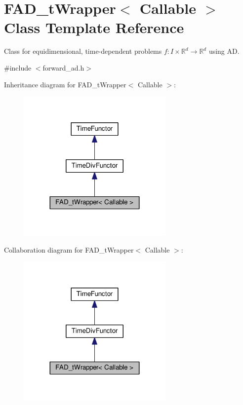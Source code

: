 \hypertarget{classFAD__tWrapper}{}\section{F\+A\+D\+\_\+t\+Wrapper$<$ Callable $>$ Class Template Reference}
\label{classFAD__tWrapper}


Class for equidimensional, time-\/dependent problems $f:I\times\mathbb{R}^d \rightarrow \mathbb{R}^d$ using AD.  




{\ttfamily \#include $<$forward\+\_\+ad.\+h$>$}



Inheritance diagram for F\+A\+D\+\_\+t\+Wrapper$<$ Callable $>$\+:\nopagebreak
\begin{figure}[H]
\begin{center}
\leavevmode
\includegraphics[width=215pt]{classFAD__tWrapper__inherit__graph}
\end{center}
\end{figure}


Collaboration diagram for F\+A\+D\+\_\+t\+Wrapper$<$ Callable $>$\+:\nopagebreak
\begin{figure}[H]
\begin{center}
\leavevmode
\includegraphics[width=215pt]{classFAD__tWrapper__coll__graph}
\end{center}
\end{figure}
